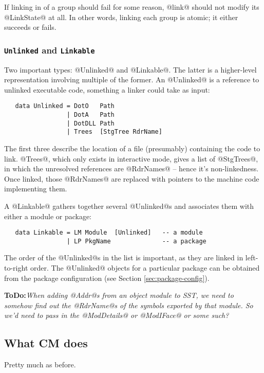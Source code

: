 \documentclass[11pt]{article}
\newcommand{\ToDo}[1]{{{\bf ToDo:}\sl #1}}
\begin{document}
If linking in of a group should fail for some reason, @link@ should
not modify its @LinkState@ at all.  In other words, linking each group
is atomic; it either succeeds or fails.

\subsubsection*{\mbox{\tt Unlinked} and \mbox{\tt Linkable}}

Two important types: @Unlinked@ and @Linkable@.  The latter is a 
higher-level representation involving multiple of the former.
An @Unlinked@ is a reference to unlinked executable code, something
a linker could take as input:

\begin{verbatim}
   data Unlinked = DotO   Path
                 | DotA   Path            
                 | DotDLL Path
                 | Trees  [StgTree RdrName]
\end{verbatim}

The first three describe the location of a file (presumably)
containing the code to link.  @Trees@, which only exists in
interactive mode, gives a list of @StgTrees@, in which the unresolved
references are @RdrNames@ -- hence it's non-linkedness.  Once linked,
those @RdrNames@ are replaced with pointers to the machine code
implementing them.

A @Linkable@ gathers together several @Unlinked@s and associates them
with either a module or package:

\begin{verbatim}
   data Linkable = LM Module  [Unlinked]   -- a module
                 | LP PkgName              -- a package
\end{verbatim}

The order of the @Unlinked@s in the list is important, as
they are linked in left-to-right order.  The @Unlinked@ objects for a
particular package can be obtained from the package configuration (see
Section \ref{sec:package-config}).

\ToDo{When adding @Addr@s from an object module to SST, we need to
      somehow find out the @RdrName@s of the symbols exported by that
      module. 
      So we'd need to pass in the @ModDetails@ or @ModIFace@ or some such?}



\subsection{What CM does}
\label{sec:compilation-manager}
Pretty much as before.  
\end{document}
